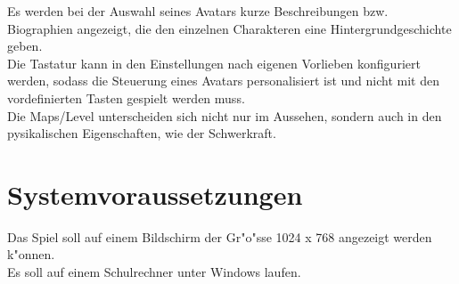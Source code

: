 \documentclass[a4paper, 11pt]{article}
\begin{document}
    \noindent
    Es werden bei der Auswahl seines Avatars kurze Beschreibungen bzw. Biographien angezeigt, die den einzelnen Charakteren
    eine Hintergrundgeschichte geben.\\

    \noindent
    Die Tastatur kann in den Einstellungen nach eigenen Vorlieben konfiguriert werden, sodass die Steuerung eines Avatars
    personalisiert ist und nicht mit den vordefinierten Tasten gespielt werden muss.\\

    \noindent
    Die Maps/Level unterscheiden sich nicht nur im Aussehen, sondern auch in den pysikalischen Eigenschaften, wie der
    Schwerkraft.

    \section{Systemvoraussetzungen}\label{sec:systemvorraussetungen}

    Das Spiel soll auf einem Bildschirm der Gr"o"ss{}e 1024 x 768 angezeigt werden k"onnen.\\

    \noindent
    Es soll auf einem Schulrechner unter Windows laufen.
\end{document}
